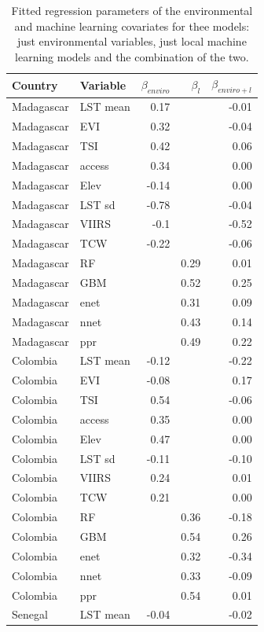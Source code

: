 \documentclass[11pt]{article}
\begin{document}
\begin{table}
\caption{Fitted regression parameters of the environmental and machine learning covariates for thee models: just environmental variables, just local machine learning models and the combination of the two.}
\centering
\tiny
\begin{tabular}{ll|rrr}
Country    & Variable &  $\beta_{enviro}$   & $\beta_l$ & $\beta_{enviro+l}$\\ \hline
Madagascar & LST mean & 0.17 &  &  -0.01\\
Madagascar & EVI & 0.32 &  & -0.04 \\
Madagascar & TSI & 0.42 &  &0.06  \\
Madagascar & access & 0.34 &  &0.00  \\
Madagascar & Elev & -0.14 &  & 0.00\\ 
Madagascar & LST sd & -0.78 &  &-0.04  \\
Madagascar & VIIRS & -0.1 &  &-0.52  \\
Madagascar & TCW & -0.22 &  & -0.06\\ 
Madagascar & RF &  & 0.29 &  0.01\\
Madagascar & GBM &  & 0.52 & 0.25 \\
Madagascar & enet &  & 0.31 &0.09  \\
Madagascar & nnet &  & 0.43 &0.14  \\
Madagascar & ppr &  & 0.49 & 0.22\vspace{0.2cm}\\ 
Colombia & LST mean &-0.12  &  & -0.22\\
Colombia & EVI &  -0.08&  & 0.17\\
Colombia & TSI &  0.54&  & -0.06\\
Colombia & access &  0.35&  &0.00 \\
Colombia & Elev &  0.47&  & 0.00\\
Colombia & LST sd & -0.11 &  & -0.10\\
Colombia & VIIRS & 0.24 &  & 0.01\\
Colombia & TCW &  0.21&  & 0.00\\
Colombia & RF &  & 0.36 & -0.18\\
Colombia & GBM &  & 0.54 & 0.26\\
Colombia & enet &  & 0.32 & -0.34\\
Colombia & nnet &  &0.33  & -0.09\\
Colombia & ppr &  & 0.54 & 0.01\vspace{0.2cm}\\
Senegal & LST mean &-0.04  &  &-0.02\\

\end{tabular}
\end{table}
\end{document}
